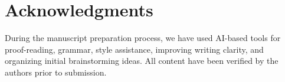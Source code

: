 \section*{Acknowledgments}

During the manuscript preparation process, we have used AI-based tools for proof-reading, grammar, style assistance, improving writing clarity, and organizing initial brainstorming ideas. All content have been verified by the authors prior to submission.